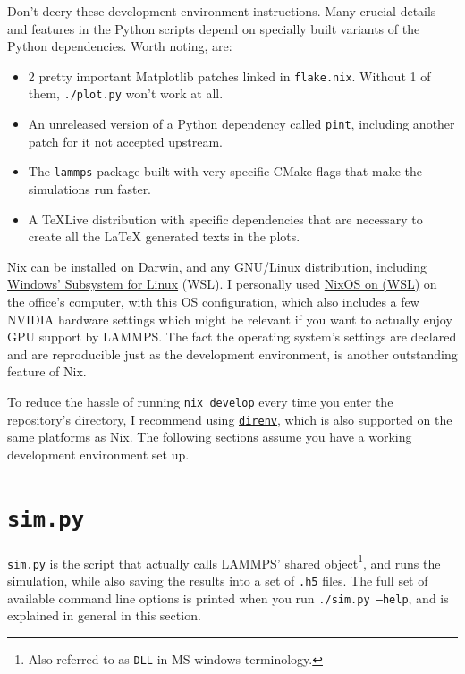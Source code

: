 Don't decry these development environment instructions. Many crucial details and features in the Python scripts depend on specially built variants of the Python dependencies. Worth noting, are:

\begin{itemize}
	\item 2 pretty important Matplotlib patches linked in \texttt{flake.nix}. Without 1 of them, \texttt{./plot.py} won't work at all.
	\item An unreleased version of a Python dependency called \texttt{pint}, including another patch for it not accepted upstream.
	\item The \texttt{lammps} package built with very specific CMake flags that make the simulations run faster.
	\item A TeXLive distribution with specific dependencies that are necessary to create all the LaTeX generated texts in the plots.
\end{itemize}

Nix can be installed on Darwin, and any GNU/Linux distribution, including \href{https://learn.microsoft.com/en-us/windows/wsl/install}{Windows' Subsystem for Linux} (WSL). I personally used \href{https://github.com/nix-community/NixOS-WSL}{NixOS on (WSL)} on the office's computer, with \href{https://gitlab.com/doronbehar/nixos-configs/-/blob/b540a8fef332ff64d0ae52a67ef96758b7d2b396/flake.nix#L104-134}{this} OS configuration, which also includes a few NVIDIA hardware settings which might be relevant if you want to actually enjoy GPU support by LAMMPS. The fact the operating system's settings are declared and are reproducible just as the development environment, is another outstanding feature of Nix.

To reduce the hassle of running \texttt{nix develop} every time you enter the repository's directory, I recommend using \href{https://direnv.net/}{\texttt{direnv}}, which is also supported on the same platforms as Nix. The following sections assume you have a working development environment set up.

\section{\texttt{sim.py}}

\texttt{sim.py} is the script that actually calls LAMMPS' shared object\footnote{Also referred to as \texttt{DLL} in MS windows terminology.}, and runs the simulation, while also saving the results into a set of \texttt{.h5} files. The full set of available command line options is printed when you run \texttt{./sim.py --help}, and is explained in general in this section.

